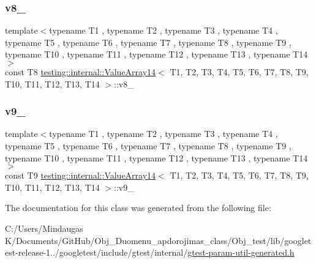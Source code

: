 \mbox{\label{classtesting_1_1internal_1_1_value_array14_af35b8c435cb4a0c4c4698d00533d8fbd}} 
\subsubsection{\texorpdfstring{v8\_}{v8\_}}
{\footnotesize\ttfamily template$<$typename T1 , typename T2 , typename T3 , typename T4 , typename T5 , typename T6 , typename T7 , typename T8 , typename T9 , typename T10 , typename T11 , typename T12 , typename T13 , typename T14 $>$ \\
const T8 \mbox{\hyperlink{classtesting_1_1internal_1_1_value_array14}{testing\+::internal\+::\+Value\+Array14}}$<$ T1, T2, T3, T4, T5, T6, T7, T8, T9, T10, T11, T12, T13, T14 $>$\+::v8\+\_\+\hspace{0.3cm}{\ttfamily [private]}}

\mbox{\label{classtesting_1_1internal_1_1_value_array14_abaa254af69061f7333ec517cd566376b}} 
\subsubsection{\texorpdfstring{v9\_}{v9\_}}
{\footnotesize\ttfamily template$<$typename T1 , typename T2 , typename T3 , typename T4 , typename T5 , typename T6 , typename T7 , typename T8 , typename T9 , typename T10 , typename T11 , typename T12 , typename T13 , typename T14 $>$ \\
const T9 \mbox{\hyperlink{classtesting_1_1internal_1_1_value_array14}{testing\+::internal\+::\+Value\+Array14}}$<$ T1, T2, T3, T4, T5, T6, T7, T8, T9, T10, T11, T12, T13, T14 $>$\+::v9\+\_\+\hspace{0.3cm}{\ttfamily [private]}}



The documentation for this class was generated from the following file\+:\begin{DoxyCompactItemize}
\item 
C\+:/\+Users/\+Mindaugas K/\+Documents/\+Git\+Hub/\+Obj\+\_\+\+Duomenu\+\_\+apdorojimas\+\_\+class/\+Obj\+\_\+test/lib/googletest-\/release-\/1../googletest/include/gtest/internal/\mbox{\hyperlink{gtest-param-util-generated_8h}{gtest-\/param-\/util-\/generated.\+h}}\end{DoxyCompactItemize}
